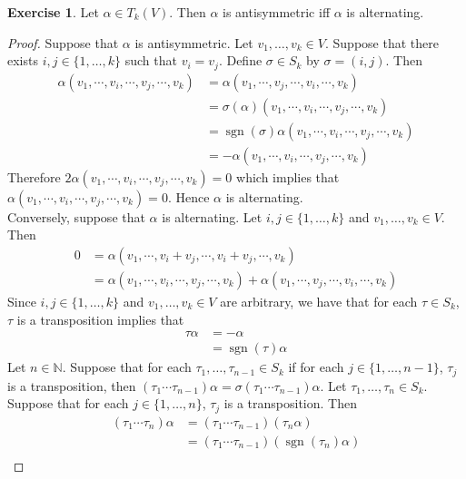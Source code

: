 \documentclass{book}
\theoremstyle{definition}
\newtheorem{ex}[definition]{Exercise}
\newcommand{\al}{\alpha}
\newcommand{\sig}{\sigma}
\newcommand{\N}{\mathbb{N}}
\DeclareMathOperator{\sgn}{sgn}
\DeclareMathOperator*{\0}{\mbf{0}}
\DeclareMathOperator*{\1}{\mbf{1}}
\begin{document}
	\begin{ex}
		Let $\al \in T_k(V)$. Then $\al$ is antisymmetric iff $\al$ is alternating.
	\end{ex}

	\begin{proof}
		Suppose that $\al$ is antisymmetric. Let $v_1, \ldots, v_k \in V$. Suppose that there exists $i,j \in \{1, \ldots, k\}$ such that $v_i = v_j$. Define $\sig \in S_k$ by $\sig = (i,j)$. Then 
		\begin{align*}
			\al (v_1, \cdots, v_i, \cdots, v_j, \cdots,  v_k)  
			& = \al (v_1, \cdots, v_j, \cdots, v_i, \cdots,  v_k)  \\
			& = \sig(\al) (v_1, \cdots, v_i, \cdots, v_j, \cdots,  v_k) \\
			& = \sgn(\sig)\al (v_1, \cdots, v_i, \cdots, v_j, \cdots,  v_k) \\
			& = -\al (v_1, \cdots, v_i, \cdots, v_j, \cdots,  v_k) 
		\end{align*} 
		Therefore $2 \al (v_1, \cdots, v_i, \cdots, v_j, \cdots,  v_k) = 0$ which implies that $\al (v_1, \cdots, v_i, \cdots, v_j, \cdots,  v_k) = 0$. Hence $\al$ is alternating. \\
		Conversely, suppose that $\al$ is alternating. Let $i,j \in \{1, \ldots, k\}$ and $v_1, \ldots, v_k \in V$. Then 
		\begin{align*}
			0 
			& = \al(v_1, \cdots, v_i + v_j, \cdots, v_i + v_j, \cdots,  v_k) \\
			& = \al(v_1, \cdots, v_i, \cdots, v_j, \cdots,  v_k) + \al(v_1, \cdots, v_j, \cdots, v_i, \cdots,  v_k)
		\end{align*}
		Since $i,j \in \{1, \ldots, k\}$ and $v_1, \ldots, v_k \in V$ are arbitrary, we have that for each $\tau \in S_k$, $\tau$ is a transposition implies that
		\begin{align*}
			\tau \al
			& = - \al \\
			& = \sgn(\tau) \al
		\end{align*}
		Let $n \in \N$. Suppose that for each $\tau_1, \ldots, \tau_{n-1} \in S_k$ if for each $j \in \{1, \ldots, n-1\}$, $\tau_j$ is a transposition, then $(\tau_1 \cdots \tau_{n-1}) \al = \sig(\tau_1 \cdots \tau_{n-1}) \al$. Let $\tau_1, \ldots, \tau_n \in S_k$. Suppose that for each $j \in \{1, \ldots, n\}$, $\tau_j$ is a transposition.
		Then 
		\begin{align*}
			(\tau_1 \cdots \tau_n) \al 
			& = (\tau_1 \cdots \tau_{n-1}) (\tau_n \al) \\
			& = (\tau_1 \cdots \tau_{n-1}) (\sgn(\tau_n ) \al) \\

\end{align*}
\end{proof}
\end{document}
